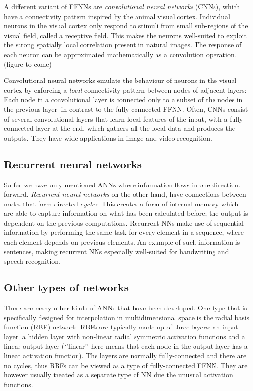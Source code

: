 \documentclass[11pt]{article}
\begin{document}
A different variant of FFNNs are \emph{convolutional neural networks}
(CNNs), which have a connectivity pattern inspired by the animal visual
cortex. Individual neurons in the visual cortex only respond to stimuli
from small sub-regions of the visual field, called a receptive field.
This makes the neurons well-suited to exploit the strong spatially local
correlation present in natural images. The response of each neuron can
be approximated mathematically as a convolution operation. (figure to
come)

Convolutional neural networks emulate the behaviour of neurons in the
visual cortex by enforcing a \emph{local} connectivity pattern between
nodes of adjacent layers: Each node in a convolutional layer is
connected only to a subset of the nodes in the previous layer, in
contrast to the fully-connected FFNN. Often, CNNs consist of several
convolutional layers that learn local features of the input, with a
fully-connected layer at the end, which gathers all the local data and
produces the outputs. They have wide applications in image and video
recognition.

\hypertarget{recurrent-neural-networks}{%
\subsection{Recurrent neural networks}\label{recurrent-neural-networks}}

So far we have only mentioned ANNs where information flows in one
direction: forward. \emph{Recurrent neural networks} on the other hand,
have connections between nodes that form directed \emph{cycles}. This
creates a form of internal memory which are able to capture information
on what has been calculated before; the output is dependent on the
previous computations. Recurrent NNs make use of sequential information
by performing the same task for every element in a sequence, where each
element depends on previous elements. An example of such information is
sentences, making recurrent NNs especially well-suited for handwriting
and speech recognition.

\hypertarget{other-types-of-networks}{%
\subsection{Other types of networks}\label{other-types-of-networks}}

There are many other kinds of ANNs that have been developed. One type
that is specifically designed for interpolation in multidimensional
space is the radial basis function (RBF) network. RBFs are typically
made up of three layers: an input layer, a hidden layer with non-linear
radial symmetric activation functions and a linear output layer
(`'linear'' here means that each node in the output layer has a linear
activation function). The layers are normally fully-connected and there
are no cycles, thus RBFs can be viewed as a type of fully-connected
FFNN. They are however usually treated as a separate type of NN due the
unusual activation functions.
\end{document}

